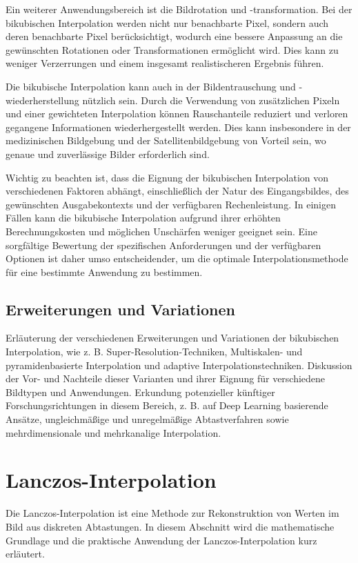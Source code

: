 Ein weiterer Anwendungsbereich ist die Bildrotation und -transformation.
Bei der bikubischen Interpolation werden nicht nur benachbarte Pixel, sondern auch deren benachbarte Pixel berücksichtigt, wodurch eine bessere Anpassung an die gewünschten Rotationen oder Transformationen ermöglicht wird.
Dies kann zu weniger Verzerrungen und einem insgesamt realistischeren Ergebnis führen.

Die bikubische Interpolation kann auch in der Bildentrauschung und -wiederherstellung nützlich sein.
Durch die Verwendung von zusätzlichen Pixeln und einer gewichteten Interpolation können Rauschanteile reduziert und verloren gegangene Informationen wiederhergestellt werden.
Dies kann insbesondere in der medizinischen Bildgebung und der Satellitenbildgebung von Vorteil sein, wo genaue und zuverlässige Bilder erforderlich sind.

Wichtig zu beachten ist, dass die Eignung der bikubischen Interpolation von verschiedenen Faktoren abhängt, einschließlich der Natur des Eingangsbildes, des gewünschten Ausgabekontexts und der verfügbaren Rechenleistung.
In einigen Fällen kann die bikubische Interpolation aufgrund ihrer erhöhten Berechnungskosten und möglichen Unschärfen weniger geeignet sein.
Eine sorgfältige Bewertung der spezifischen Anforderungen und der verfügbaren Optionen ist daher umso entscheidender, um die optimale Interpolationsmethode für eine bestimmte Anwendung zu bestimmen.

    \subsection{Erweiterungen und Variationen}

    Erläuterung der verschiedenen Erweiterungen und Variationen der bikubischen Interpolation, wie z.
    B. Super-Resolution-Techniken, Multiskalen- und pyramidenbasierte Interpolation und adaptive Interpolationstechniken.
    Diskussion der Vor- und Nachteile dieser Varianten und ihrer Eignung für verschiedene Bildtypen und Anwendungen.
    Erkundung potenzieller künftiger Forschungsrichtungen in diesem Bereich, z.
    B. auf Deep Learning basierende Ansätze, ungleichmäßige und unregelmäßige Abtastverfahren sowie mehrdimensionale und mehrkanalige Interpolation.


\section{Lanczos-Interpolation}
    Die Lanczos-Interpolation ist eine Methode zur Rekonstruktion von Werten im Bild aus diskreten Abtastungen. 
    In diesem Abschnitt wird die mathematische Grundlage und die praktische Anwendung der Lanczos-Interpolation kurz erläutert.

